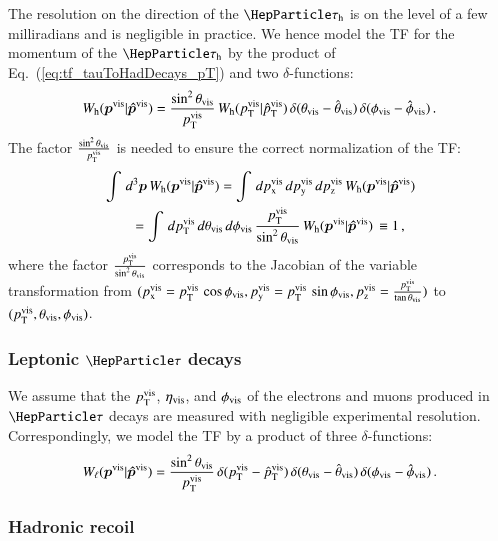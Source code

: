 The resolution on the direction of the $\tauh$ is on the level
of a few milliradians and is negligible in practice.
We hence model the TF for the momentum of the $\tauh$ by the product of Eq.~(\ref{eq:tf_tauToHadDecays_pT}) and two
$\delta$-functions:
\begin{equation}
W_{\textrm{h}}( \bm{p}^{\textrm{vis}} | \bm{\hat{p}}^{\textrm{vis}} ) =
 \frac{\sin^{2}\theta_{\textrm{vis}}}{p_{\textrm{T}}^{\textrm{vis}}} \, 
  W_{\textrm{h}}( p_{\textrm{T}}^{\textrm{vis}} | \hat{p}_{\textrm{T}}^{\textrm{vis}} ) \,
  \delta( \theta_{\textrm{vis}} - \hat{\theta}_{\textrm{vis}} ) \, 
  \delta( \phi_{\textrm{vis}} - \hat{\phi}_{\textrm{vis}} ) \, .
\label{eq:tf_tauToHadDecays}
\end{equation}
The factor $\frac{\sin^{2}\theta_{\textrm{vis}}}{p_{\textrm{T}}^{\textrm{vis}}}$ is needed
to ensure the correct normalization of the TF:
\begin{align}
& \int \, d^{3}\bm{p}  \, W_{\textrm{h}}( \bm{p}^{\textrm{vis}} | \bm{\hat{p}}^{\textrm{vis}} ) = \int \, dp_{\textrm{x}}^{\textrm{vis}} \, dp_{\textrm{y}}^{\textrm{vis}} \, dp_{\textrm{z}}^{\textrm{vis}} \, W_{\textrm{h}}( \bm{p}^{\textrm{vis}} | \bm{\hat{p}}^{\textrm{vis}} ) \nonumber \\
& \qquad = \int \, dp_{\textrm{T}}^{\textrm{vis}} \, d\theta_{\textrm{vis}} \, d\phi_{\textrm{vis}} \,
\frac{p_{\textrm{T}}^{\textrm{vis}}}{\sin^{2} \theta_{\textrm{vis}}} \, W_{\textrm{h}}( \bm{p}^{\textrm{vis}} | \bm{\hat{p}}^{\textrm{vis}} ) \, 
  \equiv 1 \, ,
\end{align}
where the factor $\frac{p_{\textrm{T}}^{\textrm{vis}}}{\sin^{2} \theta_{\textrm{vis}}}$ corresponds to the Jacobian of the variable transformation 
from $(p_{\textrm{x}}^{\textrm{vis}} = p_{\textrm{T}}^{\textrm{vis}} \, \cos\phi_{\textrm{vis}}, p_{\textrm{y}}^{\textrm{vis}} = p_{\textrm{T}}^{\textrm{vis}} \, \sin\phi_{\textrm{vis}}, p_{\textrm{z}}^{\textrm{vis}} = \frac{p_{\textrm{T}}^{\textrm{vis}}}{\tan\theta_{\textrm{vis}}})$ 
to $(p_{\textrm{T}}^{\textrm{vis}}, \theta_{\textrm{vis}}, \phi_{\textrm{vis}})$.


\subsubsection{Leptonic $\Pgt$ decays}
\label{sec:mem_TF_tauToLepDecays}

We assume that the $p_{\textrm{T}}^{\textrm{vis}}$, $\eta_{\textrm{vis}}$, and $\phi_{\textrm{vis}}$
of the electrons and muons produced in $\Pgt$ decays are measured with negligible experimental resolution.
Correspondingly, we model the TF by a product of three $\delta$-functions:
\begin{equation}
W_{\ell}( \bm{p}^{\textrm{vis}} | \bm{\hat{p}}^{\textrm{vis}} ) =  
 \frac{\sin^{2} \theta_{\textrm{vis}}}{p_{\textrm{T}}^{\textrm{vis}}} \, 
  \delta( p_{\textrm{T}}^{\textrm{vis}} - \hat{p}_{\textrm{T}}^{\textrm{vis}} ) \, 
  \delta( \theta_{\textrm{vis}} - \hat{\theta}_{\textrm{vis}} ) \, 
  \delta( \phi_{\textrm{vis}} - \hat{\phi}_{\textrm{vis}} ) \, .
\label{eq:tf_tauToLepDecays}
\end{equation}


\subsubsection{Hadronic recoil}
\label{sec:mem_TF_hadRecoil}

